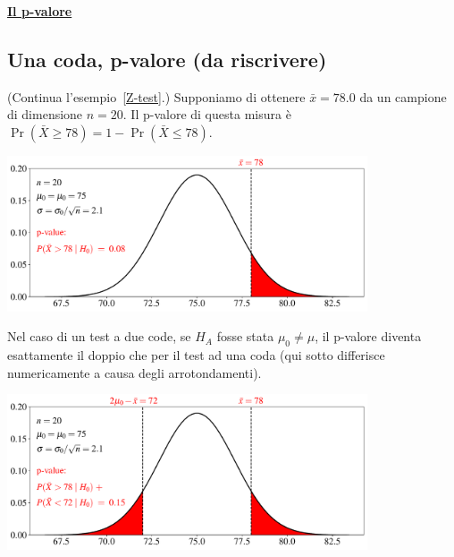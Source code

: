 \documentclass[11pt,openany]{book}
\begin{document}

\clearpage
\hfill\textbf{{\color{brown}\hyperref[pvalore]{Il p-valore \faShare}}}
\subsection{Una coda, p-valore (da riscrivere)}
(Continua l'esempio~\ref{Z-test}.) Supponiamo di ottenere $\bar x=78.0$ da un campione di dimensione $n=20$. Il p-valore di questa misura è $\Pr(\bar X\ge 78)=1-\Pr(\bar X\le 78)$.

\hfil\includegraphics[width=0.8\textwidth]{figure/Z-test-p-val_01.pdf}

Nel caso di un test a due code, se $H_A$ fosse stata $\mu_0\neq\mu$, il p-valore diventa esattamente il doppio che per il test ad una coda (qui sotto differisce numericamente a causa degli arrotondamenti). 

\hfil\includegraphics[width=0.8\textwidth]{figure/Z-test-p-val_02.pdf}
\end{document}

